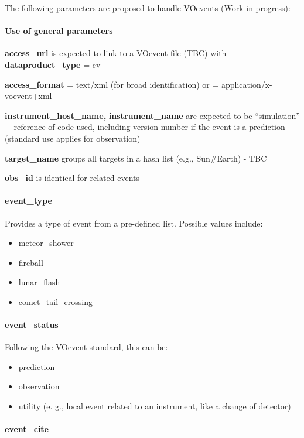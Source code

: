 \documentclass[11pt,a4paper]{ivoa}
\begin{document}
The following parameters are proposed to handle VOevents (Work in progress):

\paragraph{Use of general parameters\textbf{ }}


\textbf{access\_url} is expected to link to a VOevent file (TBC) with \textbf{dataproduct\_type} = ev 

\textbf{access\_format} = text/xml (for broad identification) or = application/x-voevent+xml 

\textbf{instrument\_host\_name,} \textbf{instrument\_name} are expected to be ``simulation'' + reference of code used, including version number if the event is a prediction (standard use applies for observation)

\textbf{target\_name} groups all targets in a hash list (e.g., Sun\#Earth) - TBC

\textbf{obs\_id} is identical for related events

\paragraph{event\_type}

Provides a type of event from a pre-defined list. Possible values include:

\begin{itemize}
\item meteor\_shower
\item fireball
\item lunar\_flash
\item comet\_tail\_crossing
\end{itemize}

\paragraph{event\_status}

Following the VOevent standard, this can be:

\begin{itemize}
\item prediction
\item observation
\item utility (e. g., local event related to an instrument, like a change of detector)
\end{itemize}

\paragraph{event\_cite}
\end{document}
